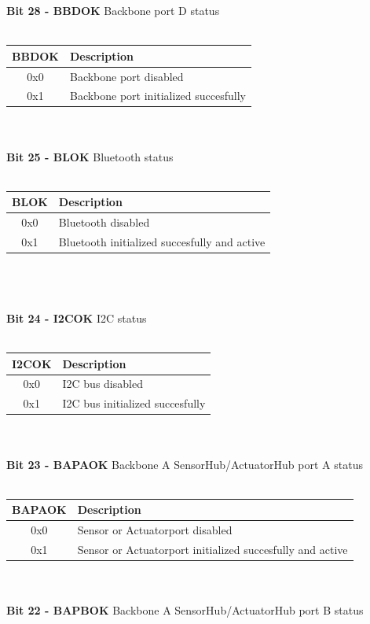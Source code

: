 \textbf{Bit 28 - BBDOK} Backbone port D status\\\\
\begin{tabular}{|c|l|}
    \hline
   BBDOK & Description\\ \hline
   0x0 & Backbone port disabled\\ \hline
   0x1 & Backbone port initialized succesfully \\ \hline
\end{tabular}\\\\
\textbf{Bit 25 - BLOK} Bluetooth status\\\\
\begin{tabular}{|c|l|}
    \hline
   BLOK & Description\\ \hline
   0x0 & Bluetooth disabled\\ \hline
   0x1 & Bluetooth initialized succesfully and active\\ \hline
\end{tabular}\\\\
\pagebreak\\
\textbf{Bit 24 - I2COK} I2C status\\\\
\begin{tabular}{|c|l|}
    \hline
   I2COK & Description\\ \hline
   0x0 & I2C bus disabled\\ \hline
   0x1 & I2C bus initialized succesfully \\ \hline
\end{tabular}\\\\
\textbf{Bit 23 - BAPAOK} Backbone A SensorHub/ActuatorHub port A status\\\\
\begin{tabular}{|c|l|}
    \hline
   BAPAOK & Description\\ \hline
   0x0 & Sensor or Actuatorport disabled\\ \hline
   0x1 & Sensor or Actuatorport initialized succesfully and active\\ \hline
\end{tabular}\\\\
\textbf{Bit 22 - BAPBOK} Backbone A SensorHub/ActuatorHub port B status\\\\

